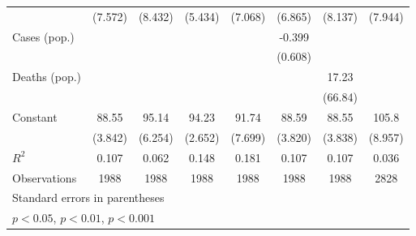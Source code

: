 \documentclass{article}
\begin{document}
{\begin{longtable}{l*{7}{c}}
                &  (7.572)         &  (8.432)         &  (5.434)         &  (7.068)         &  (6.865)         &  (8.137)         &  (7.944)         \\
Cases (pop.)    &                  &                  &                  &                  &   -0.399         &                  &                  \\
                &                  &                  &                  &                  &  (0.608)         &                  &                  \\
Deaths (pop.)   &                  &                  &                  &                  &                  &    17.23         &                  \\
                &                  &                  &                  &                  &                  &  (66.84)         &                  \\
Constant        &    88.55\sym{***}&    95.14\sym{***}&    94.23\sym{***}&    91.74\sym{***}&    88.59\sym{***}&    88.55\sym{***}&    105.8\sym{***}\\
                &  (3.842)         &  (6.254)         &  (2.652)         &  (7.699)         &  (3.820)         &  (3.838)         &  (8.957)         \\
\hline
\(R^{2}\)       &    0.107         &    0.062         &    0.148         &    0.181         &    0.107         &    0.107         &    0.036         \\
Observations    &     1988         &     1988         &     1988         &     1988         &     1988         &     1988         &     2828         \\
\hline\hline
\multicolumn{8}{l}{\footnotesize Standard errors in parentheses}\\
\multicolumn{8}{l}{\footnotesize \sym{*} \(p<0.05\), \sym{**} \(p<0.01\), \sym{***} \(p<0.001\)}\\
\end{longtable}
}
\end{document}
